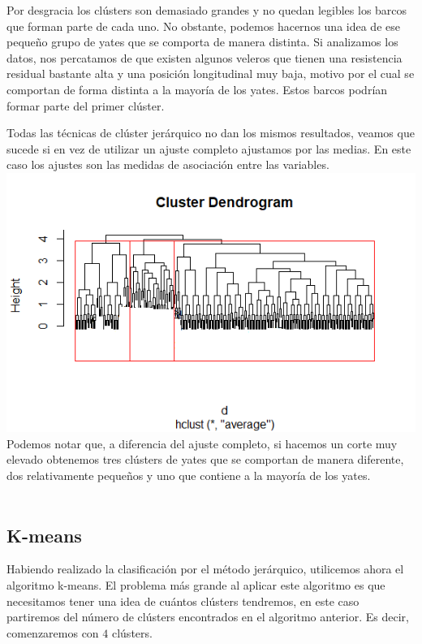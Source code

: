 \documentclass[twoside]{article}
\begin{document}
\begin{multicols}{2}
Por desgracia los cl\'usters son demasiado grandes y no quedan legibles los barcos que forman parte de cada uno. No obstante, podemos hacernos una idea de ese peque\~no grupo de yates que se comporta de manera distinta. Si analizamos los datos, nos percatamos de que existen algunos veleros que tienen una resistencia residual bastante alta y una posici\'on longitudinal muy baja, motivo por el cual se comportan de forma distinta a la mayor\'ia de los yates. Estos barcos podr\'ian formar parte del primer cl\'uster.

Todas las t\'ecnicas de cl\'uster jer\'arquico no dan los mismos resultados, veamos que sucede si en vez de utilizar un ajuste completo ajustamos por las medias. En este caso los ajustes son las medidas de asociaci\'on entre las variables.\\

\includegraphics[scale=0.5]{images/pic_31.png} \\

Podemos notar que, a diferencia del ajuste completo, si hacemos un corte muy elevado obtenemos tres cl\'usters de yates que se comportan de manera diferente, dos relativamente peque\~nos y uno que contiene a la mayor\'ia de los yates.\\\\




\subsection{K-means}
Habiendo realizado la clasificaci\'on por el m\'etodo jer\'arquico, utilicemos ahora el algoritmo k-means. El problema m\'as grande al aplicar este algoritmo es que necesitamos tener una idea de cu\'antos cl\'usters tendremos, en este caso partiremos del n\'umero de cl\'usters encontrados en el algoritmo anterior. Es decir, comenzaremos con $4$ cl\'usters.\\


\end{multicols}
\end{document}
